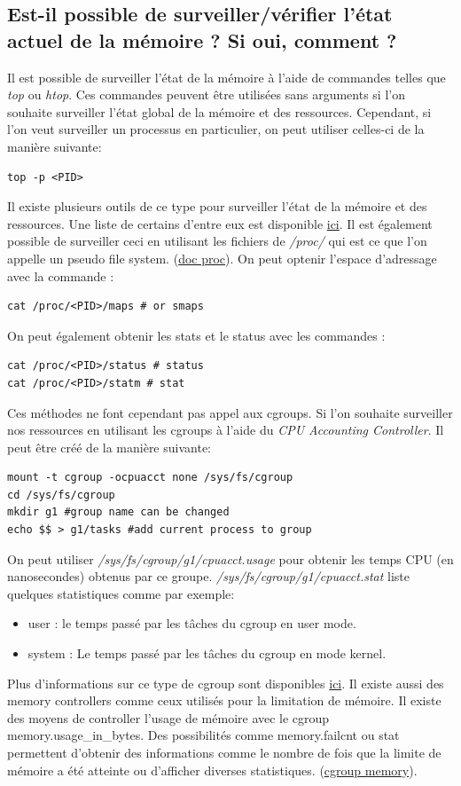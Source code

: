 \documentclass{ReportTemplate}
\begin{document}
\subsection{Est-il possible de surveiller/vérifier l’état actuel de la mémoire ? Si oui, comment ?}
Il est possible de surveiller l'état de la mémoire à l'aide de commandes telles
que \textit{top} ou \textit{htop}. Ces commandes peuvent être utilisées sans
arguments si l'on souhaite surveiller l'état global de la mémoire et des
ressources. Cependant, si l'on veut surveiller un processus en particulier, on
peut utiliser celles-ci de la manière suivante:
\begin{verbatim}
top -p <PID>
\end{verbatim}
\newpage
Il existe plusieurs outils de ce type pour surveiller l'état de la mémoire et
des ressources. Une liste de certains d'entre eux est disponible
\href{https://geekflare.com/fr/process-cpu-memory-monitoring/}{ici}.
Il est également possible de surveiller ceci en utilisant les fichiers de
\textit{/proc/} qui est ce que l'on appelle un pseudo file system.
(\href{https://man7.org/linux/man-pages/man5/proc.5.html}{doc proc}).
On peut optenir l'espace d'adressage avec la commande :
\begin{verbatim}
cat /proc/<PID>/maps # or smaps
\end{verbatim}
On peut également obtenir les stats et le status avec les commandes :
\begin{verbatim}
cat /proc/<PID>/status # status
cat /proc/<PID>/statm # stat
\end{verbatim}
Ces méthodes ne font cependant pas appel aux cgroups. Si l'on souhaite
surveiller nos ressources en utilisant les cgroups à l'aide du \textit{CPU
Accounting Controller}. Il peut être créé de la manière suivante:
\begin{verbatim}
mount -t cgroup -ocpuacct none /sys/fs/cgroup
cd /sys/fs/cgroup
mkdir g1 #group name can be changed 
echo $$ > g1/tasks #add current process to group
\end{verbatim}
On peut utiliser \textit{/sys/fs/cgroup/g1/cpuacct.usage} pour obtenir les temps
CPU (en nanosecondes) obtenus par ce groupe.
\textit{/sys/fs/cgroup/g1/cpuacct.stat} liste quelques statistiques comme par
exemple:
\begin{itemize}
    \item user : le temps passé par les tâches du cgroup en user mode.
    \item system : Le temps passé par les tâches du cgroup en mode kernel.
\end{itemize}
Plus d'informations sur ce type de cgroup sont disponibles
\href{https://www.kernel.org/doc/html/latest/admin-guide/cgroup-v1/cpuacct.html}{ici}.
\newline
Il existe aussi des memory controllers comme ceux utilisés pour la limitation de
mémoire. Il existe des moyens de controller l'usage de mémoire avec le cgroup
memory.usage\_in\_bytes. Des possibilités comme memory.failcnt ou stat
permettent d'obtenir des informations comme le nombre de fois que la limite de
mémoire a été atteinte ou d'afficher diverses statistiques.
(\href{https://www.kernel.org/doc/html/latest/admin-guide/cgroup-v1/memory.html}{cgroup
memory}).
\end{document}

